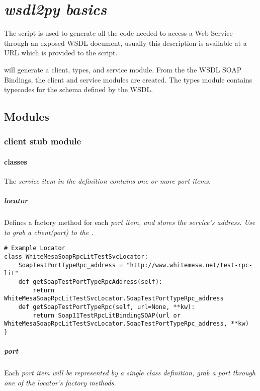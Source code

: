 \chapter{\it{wsdl2py} basics}

The \WPY script is used to generate all the code needed to access a Web Service
through an exposed WSDL document, usually this description is available at a URL
which is provided to the script.

\WPY will generate a client, types, and service module.   From the the WSDL
SOAP Bindings, the client and service modules are created.  The types module
contains typecodes for the schema defined by the WSDL.

\section{Modules}
\label{subsection: Modules}

\subsection{client stub module}

\subsubsection{classes}
The \it{service item} in the \WSDL definition contains one or more \it{port
items}.

\paragraph{locator}
Defines a factory method for each \it{port item}, and stores the service's
address.  Use to grab a client(port) to the \WS.

\begin{verbatim}
# Example Locator
class WhiteMesaSoapRpcLitTestSvcLocator:
    SoapTestPortTypeRpc_address = "http://www.whitemesa.net/test-rpc-lit"
    def getSoapTestPortTypeRpcAddress(self):
        return WhiteMesaSoapRpcLitTestSvcLocator.SoapTestPortTypeRpc_address
    def getSoapTestPortTypeRpc(self, url=None, **kw):
        return Soap11TestRpcLitBindingSOAP(url or WhiteMesaSoapRpcLitTestSvcLocator.SoapTestPortTypeRpc_address, **kw)
}
\end{verbatim}

\paragraph{port}
Each \it{port item} will be represented by a single class definition, grab a
port through one of the locator's factory methods.


